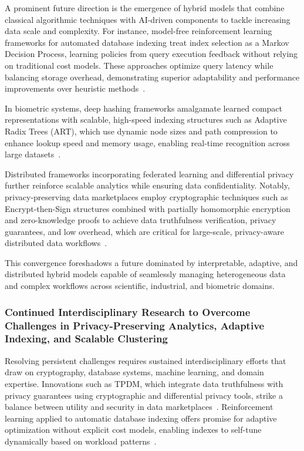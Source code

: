 \documentclass[sigconf]{acmart}
\begin{document}
A prominent future direction is the emergence of hybrid models that combine classical algorithmic techniques with AI-driven components to tackle increasing data scale and complexity. For instance, model-free reinforcement learning frameworks for automated database indexing treat index selection as a Markov Decision Process, learning policies from query execution feedback without relying on traditional cost models. These approaches optimize query latency while balancing storage overhead, demonstrating superior adaptability and performance improvements over heuristic methods~\cite{ref33}.

In biometric systems, deep hashing frameworks amalgamate learned compact representations with scalable, high-speed indexing structures such as Adaptive Radix Trees (ART), which use dynamic node sizes and path compression to enhance lookup speed and memory usage, enabling real-time recognition across large datasets~\cite{ref29}. 

Distributed frameworks incorporating federated learning and differential privacy further reinforce scalable analytics while ensuring data confidentiality. Notably, privacy-preserving data marketplaces employ cryptographic techniques such as Encrypt-then-Sign structures combined with partially homomorphic encryption and zero-knowledge proofs to achieve data truthfulness verification, privacy guarantees, and low overhead, which are critical for large-scale, privacy-aware distributed data workflows~\cite{ref25}.

This convergence foreshadows a future dominated by interpretable, adaptive, and distributed hybrid models capable of seamlessly managing heterogeneous data and complex workflows across scientific, industrial, and biometric domains.

\subsubsection{Continued Interdisciplinary Research to Overcome Challenges in Privacy-Preserving Analytics, Adaptive Indexing, and Scalable Clustering}

Resolving persistent challenges requires sustained interdisciplinary efforts that draw on cryptography, database systems, machine learning, and domain expertise. Innovations such as TPDM, which integrate data truthfulness with privacy guarantees using cryptographic and differential privacy tools, strike a balance between utility and security in data marketplaces~\cite{ref30}. Reinforcement learning applied to automatic database indexing offers promise for adaptive optimization without explicit cost models, enabling indexes to self-tune dynamically based on workload patterns~\cite{ref34}.
\end{document}
